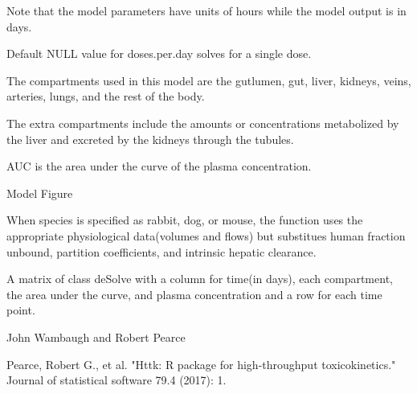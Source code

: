\documentclass[a4paper]{book}
\begin{document}
%
\begin{Details}\relax
Note that the model parameters have units of hours while the model output is
in days.

Default NULL value for doses.per.day solves for a single dose.

The compartments used in this model are the gutlumen, gut, liver, kidneys,
veins, arteries, lungs, and the rest of the body.

The extra compartments include the amounts or concentrations metabolized by
the liver and excreted by the kidneys through the tubules.

AUC is the area under the curve of the plasma concentration.

Model Figure 


When species is specified as rabbit, dog, or mouse, the function uses the
appropriate physiological data(volumes and flows) but substitues human
fraction unbound, partition coefficients, and intrinsic hepatic clearance.
\end{Details}
%
\begin{Value}
A matrix of class deSolve with a column for time(in days), each
compartment, the area under the curve, and plasma concentration and a row
for each time point.
\end{Value}
%
\begin{Author}\relax
John Wambaugh and Robert Pearce
\end{Author}
%
\begin{References}\relax
Pearce, Robert G., et al. "Httk: R package for high-throughput
toxicokinetics." Journal of statistical software 79.4 (2017): 1.
\end{References}
%
\end{document}
